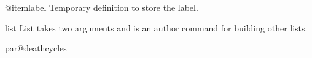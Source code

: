 \begin{teX}
\newif\if@nmbrlist  \@nmbrlistfalse
\end{teX}




\begin{docCommand} {@itemlabel} { }
  Temporary definition to store the label.
\end{docCommand}

\begin{docCommand} {list} {  }
 List takes two arguments and is an author command for building
other lists.
\end{docCommand}

    \begin{teX}
\def\list#1#2{%
  \ifnum \@listdepth >5\relax
    \@toodeep
  \else
    \global\advance\@listdepth\@ne
  \fi
   \end{teX}
Initialize all margins to 0pt in case the user did not specify anything.   
   \begin{teX}  
  \rightmargin\z@
  \listparindent\z@
  \itemindent\z@
  \csname @list\romannumeral\the\@listdepth\endcsname
  \def\@itemlabel{#1}%
  \let\makelabel\@mklab
  \@nmbrlistfalse
  #2\relax
  \@trivlist
  \parskip\parsep
  \parindent\listparindent
  \advance\linewidth -\rightmargin
  \advance\linewidth -\leftmargin
  \advance\@totalleftmargin \leftmargin
  \end{teX}
Now set parshape for the rest of the paragraphs.   
  \begin{teX}  
  \parshape \@ne \@totalleftmargin \linewidth
  \ignorespaces}
    \end{teX}


\begin{docCommand}{par@deathcycles}{}
\end{docCommand}
    \begin{teX}
\newcount\par@deathcycles
    \end{teX}
 

